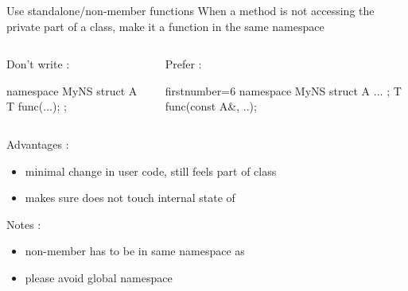 \begin{frame}[fragile]
  \begin{block}{Use standalone/non-member functions}
    When a method is not accessing the private part of a class, make it a function in the same namespace
    \vspace{-1mm}
    \begin{columns}[T]
      \begin{column}{.35\textwidth}
        Don't write :
        \vspace{-1mm}
        \begin{cppcode*}{}
          namespace MyNS {
            struct A {
              T func(...);
            };
          }
        \end{cppcode*}
      \end{column}
      \begin{column}{.35\textwidth}
        Prefer :
        \vspace{-1mm}
        \begin{cppcode*}{firstnumber=6}
          namespace MyNS {
            struct A { ... };
            T func(const A&, ..);
          }
        \end{cppcode*}
      \end{column}
    \end{columns}
    \vspace{.2cm}
    Advantages :
    \begin{itemize}
    \item minimal change in user code,  still feels part of class 
    \item makes sure  does not touch internal state of 
    \end{itemize}
    Notes :
    \begin{itemize}
    \item non-member  has to be in same namespace as 
    \item please avoid global namespace
    \end{itemize}
  \end{block}
\end{frame}

